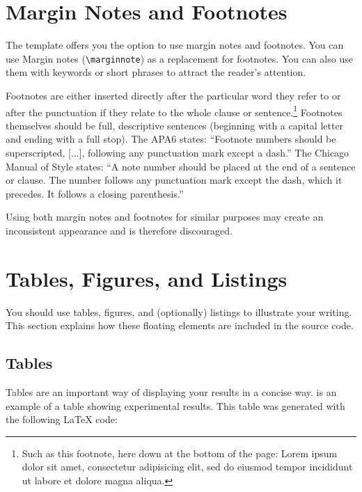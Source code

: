 \section{Margin Notes and Footnotes}

The template offers you the option to use margin notes and footnotes. You can use Margin notes (\verb|\marginnote|) as a replacement for footnotes. You can also use them with keywords or short phrases to attract the reader's attention.

Footnotes are either inserted directly after the particular word they refer to or after the punctuation if they relate to the whole clause or sentence.\footnote{Such as this footnote, here down at the bottom of the page: Lorem ipsum dolor sit amet, consectetur adipisicing elit, sed do eiusmod tempor incididunt ut labore et dolore magna aliqua.} Footnotes themselves should be full, descriptive sentences (beginning with a capital letter and ending with a full stop). The APA6 states: \enquote{Footnote numbers should be superscripted, [...], following any punctuation mark except a dash.} The Chicago Manual of Style states: \enquote{A note number should be placed at the end of a sentence or clause. The number follows any punctuation mark except the dash, which it precedes. It follows a closing parenthesis.}

Using both margin notes and footnotes for similar purposes may create an inconsistent appearance and is therefore discouraged.

\section{Tables, Figures, and Listings}

You should use tables, figures, and (optionally) listings to illustrate your writing. This section explains how these floating elements are included in the source code.

\subsection{Tables}

Tables are an important way of displaying your results in a concise way.  is an example of a table showing experimental results. This table was generated with the following LaTeX code:

